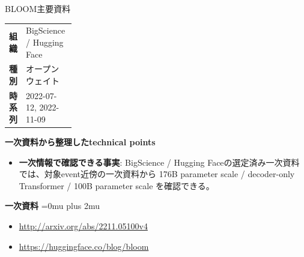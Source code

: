 \begin{technicalnote}{BLOOM}{主要資料}
\begingroup
\begin{tabularx}{\linewidth}{@{}>{\bfseries}p{0.22\linewidth}X@{}}
組織 & BigScience / Hugging Face \\
種別 & オープンウェイト \\
時系列 & 2022-07-12, 2022-11-09 \\
\end{tabularx}
\smallskip
{\bfseries 一次資料から整理したtechnical points}
\begin{itemize}[leftmargin=1.5em,itemsep=0.35em]
\item \textbf{一次情報で確認できる事実}: BigScience / Hugging Faceの選定済み一次資料では、対象event近傍の一次資料から 176B parameter scale / decoder-only Transformer / 100B parameter scale を確認できる。
\end{itemize}
\begin{minipage}{\linewidth}
\begin{samepage}
{\bfseries 一次資料}
\begingroup\sloppy
\Urlmuskip=0mu plus 2mu\relax
\begin{itemize}[leftmargin=1.5em,itemsep=0.25em]
\item {\scriptsize\url{http://arxiv.org/abs/2211.05100v4}}
\item {\scriptsize\url{https://huggingface.co/blog/bloom}}
\end{itemize}
\endgroup
\end{samepage}
\end{minipage}
\endgroup
\end{technicalnote}
\medskip

